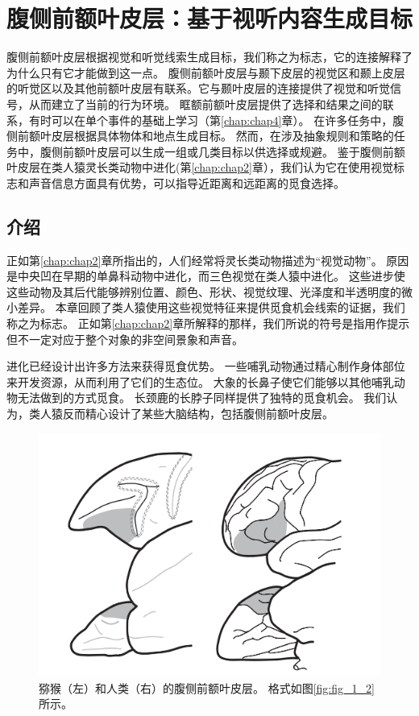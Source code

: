 \chapter{腹侧前额叶皮层：基于视听内容生成目标}
腹侧前额叶皮层根据视觉和听觉线索生成目标，我们称之为标志，它的连接解释了为什么只有它才能做到这一点。
腹侧前额叶皮层与颞下皮层的视觉区和颞上皮层的听觉区以及其他前额叶皮层有联系。它与颞叶皮层的连接提供了视觉和听觉信号，从而建立了当前的行为环境。
眶额前额叶皮层提供了选择和结果之间的联系，有时可以在单个事件的基础上学习（第\ref{chap:chap4}章）。
在许多任务中，腹侧前额叶皮层根据具体物体和地点生成目标。
然而，在涉及抽象规则和策略的任务中，腹侧前额叶皮层可以生成一组或几类目标以供选择或规避。
鉴于腹侧前额叶皮层在类人猿灵长类动物中进化(第\ref{chap:chap2}章），我们认为它在使用视觉标志和声音信息方面具有优势，可以指导近距离和远距离的觅食选择。

\section{介绍}
\par
正如第\ref{chap:chap2}章所指出的，人们经常将灵长类动物描述为“视觉动物”。
原因是中央凹在早期的单鼻科动物中进化，而三色视觉在类人猿中进化。 
这些进步使这些动物及其后代能够辨别位置、颜色、形状、视觉纹理、光泽度和半透明度的微小差异。
本章回顾了类人猿使用这些视觉特征来提供觅食机会线索的证据，我们称之为标志。
正如第\ref{chap:chap2}章所解释的那样，我们所说的符号是指用作提示但不一定对应于整个对象的非空间景象和声音。
\par
进化已经设计出许多方法来获得觅食优势。
一些哺乳动物通过精心制作身体部位来开发资源，从而利用了它们的生态位。
大象的长鼻子使它们能够以其他哺乳动物无法做到的方式觅食。
长颈鹿的长脖子同样提供了独特的觅食机会。
我们认为，类人猿反而精心设计了某些大脑结构，包括腹侧前额叶皮层。

\begin{figure} 
	\centering
	\includegraphics[width=0.7\linewidth]{image_pfc/Fig_7_1}
	\caption{猕猴（左）和人类（右）的腹侧前额叶皮层。
		格式如图\ref{fig:fig_1_2}所示。\label{fig:fig_7_1}}
\end{figure}
\par

